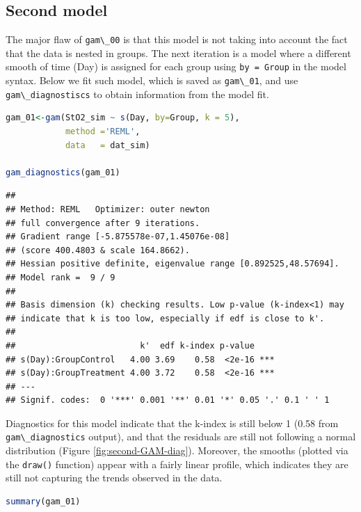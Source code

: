 \documentclass[
]{article}
\newcommand{\passthrough}[1]{#1}
\begin{document}
\hypertarget{second-model}{%
\subsection{Second model}\label{second-model}}

The major flaw of \passthrough{\lstinline!gam\_00!} is that this model is not taking into account the fact that the data is nested in groups. The next iteration is a model where a different smooth of time (Day) is assigned for each group using \passthrough{\lstinline!by = Group!} in the model syntax. Below we fit such model, which is saved as \passthrough{\lstinline!gam\_01!}, and use \passthrough{\lstinline!gam\_diagnostiscs!} to obtain information from the model fit.

\begin{lstlisting}[language=R]
gam_01<-gam(StO2_sim ~ s(Day, by=Group, k = 5),
            method ='REML',
            data   = dat_sim)

gam_diagnostics(gam_01)
\end{lstlisting}

\begin{lstlisting}
## 
## Method: REML   Optimizer: outer newton
## full convergence after 9 iterations.
## Gradient range [-5.875578e-07,1.45076e-08]
## (score 400.4803 & scale 164.8662).
## Hessian positive definite, eigenvalue range [0.892525,48.57694].
## Model rank =  9 / 9 
## 
## Basis dimension (k) checking results. Low p-value (k-index<1) may
## indicate that k is too low, especially if edf is close to k'.
## 
##                         k'  edf k-index p-value    
## s(Day):GroupControl   4.00 3.69    0.58  <2e-16 ***
## s(Day):GroupTreatment 4.00 3.72    0.58  <2e-16 ***
## ---
## Signif. codes:  0 '***' 0.001 '**' 0.01 '*' 0.05 '.' 0.1 ' ' 1
\end{lstlisting}

Diagnostics for this model indicate that the k-index is still below 1 (0.58 from \passthrough{\lstinline!gam\_diagnostics!} output), and that the residuals are still not following a normal distribution (Figure \ref{fig:second-GAM-diag}). Moreover, the smooths (plotted via the \passthrough{\lstinline!draw()!} function) appear with a fairly linear profile, which indicates they are still not capturing the trends observed in the data.

\begin{lstlisting}[language=R]
summary(gam_01)
\end{lstlisting}
\end{document}
